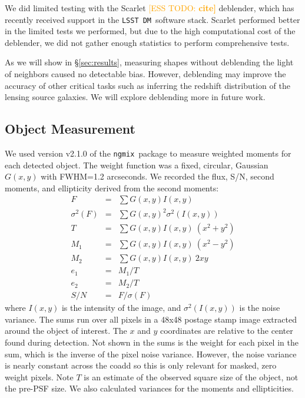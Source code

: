 \documentclass[twocolumn,twocolappendix,astrosym]{openjournal}
\newcommand{\esstodo}[1]{\textcolor{orange}{[ESS TODO: \bf #1]}}
\newcommand{\ngmix}{\texttt{ngmix}}
\newcommand{\dm}{\texttt{LSST DM}}
\begin{document}
We did limited testing with the Scarlet \esstodo{cite} deblender, which has
recently received support in the \dm\ software stack. Scarlet performed better
in the limited tests we performed, but due to the high computational cost of
the deblender, we did not gather enough statistics to perform comprehensive
tests.

As we will show in \S \ref{sec:results}, measuring shapes without deblending
the light of neighbors caused no detectable bias.  However, deblending may
improve the accuracy of other critical tasks such as inferring the redshift
distribution of the lensing source galaxies.  We will explore deblending more
in future work.

\subsection{Object Measurement} \label{sec:mdet:meas}

We used version v2.1.0 of the \ngmix\ package to measure weighted moments for
each detected object. The weight function was a fixed, circular, Gaussian $G(x,
y)$ with FWHM=1.2 arcseconds.  We recorded the flux,
S/N, second moments, and ellipticity derived from the second moments:
\begin{eqnarray} \label{eq:moments}
    F &=& \sum G(x, y) I(x, y) \nonumber \\
    \sigma^2(F) &=& \sum G(x, y)^2 \sigma^2(I(x, y)) \nonumber \\
    T &=& \sum G(x, y) I(x, y) ~ (x^2 + y^2) \nonumber \\
    M_1 &=& \sum G(x, y) I(x, y) ~ (x^2 - y^2) \\
    M_2 &=& \sum G(x, y) I(x, y) ~ 2 x y \nonumber \\
    e_1 &=& M_1 / T \nonumber \\
    e_2 &=& M_2 / T \nonumber \\
    S/N &=& F / \sigma(F) \nonumber
\end{eqnarray}
where $I(x, y)$ is the intensity of the image, and $\sigma^2(I(x, y))$ is the
noise variance. The sums run over all pixels in a 48x48 postage stamp image
extracted around the object of interest.  The $x$ and $y$ coordinates are
relative to the center found during detection.  Not shown in the sums is the
weight for each pixel in the sum, which is the inverse of the pixel noise
variance. However, the noise variance is nearly constant across the coadd so
this is only relevant for masked, zero weight pixels.  Note $T$ is an estimate
of the observed square size of the object, not the pre-PSF size.
We also calculated variances for the moments and ellipticities.
\end{document}
